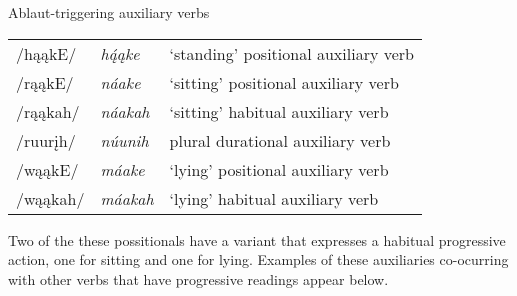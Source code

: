 \begin{exe}
\item\label{ablautsyntax} Ablaut-triggering auxiliary verbs

\begin{tabular}{lll}
/hąąkE/ 	&	\textit{hą́ąke}	&	`standing' positional auxiliary verb\\
/rąąkE/		&	\textit{náake}	&	`sitting' positional auxiliary verb\\
/rąąkah/	&	\textit{náakah}	&	`sitting' habitual auxiliary verb\\
/ruurįh/	&	\textit{núunih}&	plural durational auxiliary verb\\
/wąąkE/		&	\textit{máake}	&	`lying' positional auxiliary verb\\
/wąąkah/	&	\textit{máakah}	&	`lying' habitual auxiliary verb\\
\end{tabular}

\end{exe}

Two of the these possitionals have a variant that expresses a habitual progressive action, one for sitting and one for lying. Examples of these auxiliaries co-ocurring with other verbs that have progressive readings appear below.

